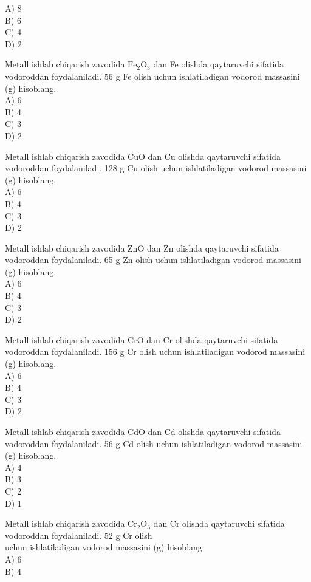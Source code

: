 A) 8\\
B) 6\\
C) 4\\
D) 2
  \item Metall ishlab chiqarish zavodida $\mathrm{Fe}_{2} \mathrm{O}_{3}$ dan Fe olishda qaytaruvchi sifatida vodoroddan foydalaniladi. 56 g Fe olish uchun ishlatiladigan vodorod massasini (g) hisoblang.\\
A) 6\\
B) 4\\
C) 3\\
D) 2
  \item Metall ishlab chiqarish zavodida CuO dan Cu olishda qaytaruvchi sifatida vodoroddan foydalaniladi. 128 g Cu olish uchun ishlatiladigan vodorod massasini (g) hisoblang.\\
A) 6\\
B) 4\\
C) 3\\
D) 2
  \item Metall ishlab chiqarish zavodida ZnO dan Zn olishda qaytaruvchi sifatida vodoroddan foydalaniladi. 65 g Zn olish uchun ishlatiladigan vodorod massasini (g) hisoblang.\\
A) 6\\
B) 4\\
C) 3\\
D) 2
  \item Metall ishlab chiqarish zavodida CrO dan Cr olishda qaytaruvchi sifatida vodoroddan foydalaniladi. 156 g Cr olish uchun ishlatiladigan vodorod massasini (g) hisoblang.\\
A) 6\\
B) 4\\
C) 3\\
D) 2
  \item Metall ishlab chiqarish zavodida CdO dan Cd olishda qaytaruvchi sifatida vodoroddan foydalaniladi. 56 g Cd olish uchun ishlatiladigan vodorod massasini (g) hisoblang.\\
A) 4\\
B) 3\\
C) 2\\
D) 1
  \item Metall ishlab chiqarish zavodida $\mathrm{Cr}_{2} \mathrm{O}_{3}$ dan Cr olishda qaytaruvchi sifatida vodoroddan foydalaniladi. 52 g Cr olish\\
uchun ishlatiladigan vodorod massasini (g) hisoblang.\\
A) 6\\
B) 4\\
